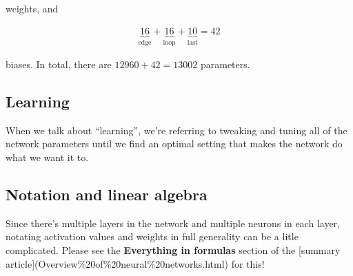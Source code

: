 \documentclass{article}
\begin{document}
	weights, and
	
	\begin{align*}
		\underbrace{16}_{\text{edge}} + \underbrace{16}_{\text{loop}} + \underbrace{10}_{\text{last}} = 42
	\end{align*}
	
	biases. In total, there are $12960 + 42 = 13002$ parameters.
	
	\subsection*{Learning}
	
	When we talk about ``learning'', we're referring to tweaking and tuning all of the network parameters until we find an optimal setting that makes the network do what we want it to.
	
	\subsection*{Notation and linear algebra}
	
	Since there's multiple layers in the network and multiple neurons in each layer, notating activation values and weights in full generality can be a litle complicated. Please see the \textbf{Everything in formulas} section of the [summary article](Overview\%20of\%20neural\%20networks.html) for this!
\end{document}

